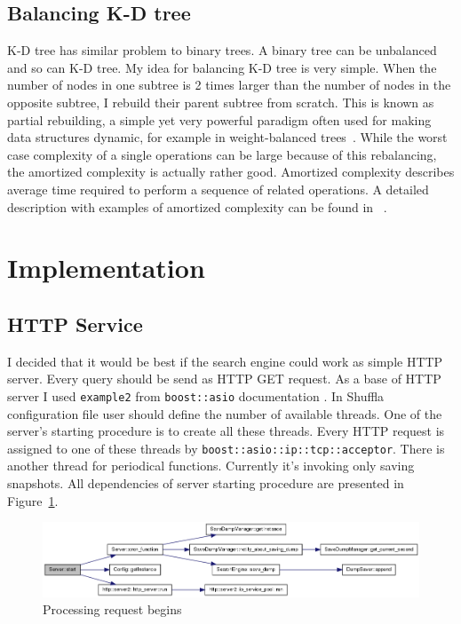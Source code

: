 \documentclass[10pt,a4paper]{article}
\begin{document}
\subsection{Balancing K-D tree}
K-D tree has similar problem to binary trees. A binary tree can be unbalanced and so can K-D tree. My idea for balancing K-D tree is very simple. When the number of nodes in one subtree is 2 times larger than the number of nodes in the opposite subtree, I rebuild their parent subtree from scratch.
This is known as partial rebuilding, a simple yet very powerful paradigm often used for making data structures dynamic, for example in weight-balanced trees~\cite{ALPHATREES}. While the worst case complexity of a single operations can be large because of this rebalancing, the amortized complexity is actually rather good. Amortized complexity describes average time required to perform a sequence of related operations. A detailed description with examples of amortized complexity can be found in ~\cite{AMOR}.

\section{Implementation}

\subsection{HTTP Service}

I decided that it would be best if the search engine could work as simple HTTP server. Every query should be send as HTTP GET request. As a base of HTTP server I used \verb|example2| from \verb|boost::asio| documentation \cite{ASIOHTTP}. In Shuffla configuration file user should define the number of available threads. One of the server's starting procedure is to create all these threads. Every HTTP request is assigned to one of these threads by \verb|boost::asio::ip::tcp::acceptor|. There is another thread for periodical functions. Currently it's invoking only saving snapshots. All dependencies of server starting procedure are presented in Figure~\ref{fig:httpservice}.

\begin{figure}[h!]
\centering
  \includegraphics[width=16cm]{start}
  \caption{Processing request begins}
  \label{fig:httpservice}
\end{figure}
\end{document}
